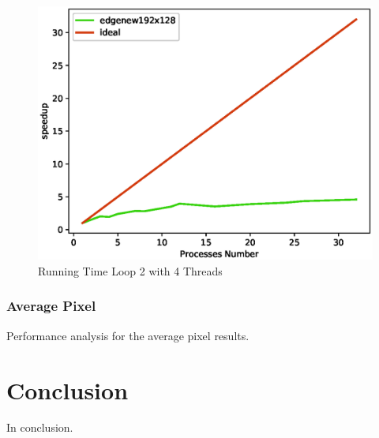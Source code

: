 \documentclass[12pt,a4paper]{article}
\newcommand{\sectionVspacing}{\vspace{15pt}}
\begin{document}
                \begin{figure}[ht]
                    \centering
                    \includegraphics[scale=0.6]{../graphs/edgenew192x128_speedup.eps}
                    \caption{Running Time Loop 2 with 4 Threads}
                    \label{loop2-threads4}
                \end{figure}
            




        \subsubsection{Average Pixel}
            Performance analysis for the average pixel results.

\sectionVspacing

\section{Conclusion}
In conclusion.
\end{document}
